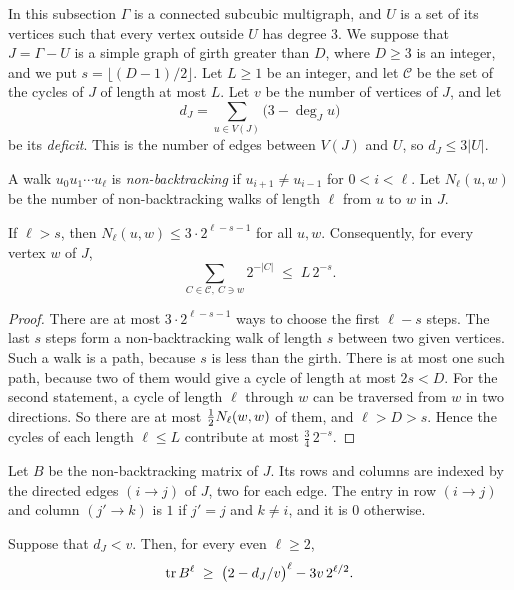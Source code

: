 In this subsection $\Gamma$ is a connected subcubic multigraph, and $U$ is a set of its vertices
such that every vertex outside $U$ has degree $3$. We suppose that
$J=\Gamma-U$ is a simple graph of girth greater than $D$, where $D\ge3$ is an integer, and we put
$s=\lfloor(D-1)/2\rfloor$. Let $L\ge1$ be an integer, and let $\mathcal{C}$ be the set of the
cycles of $J$ of length at most $L$. Let $v$ be the number of vertices of $J$, and let
\[
  d_J=\sum_{u\in V(J)}\bigl(3-\deg_Ju\bigr)
\]
be its \emph{deficit}. This is the number of edges between $V(J)$ and $U$, so $d_J\le3|U|$.

A walk $u_0u_1\cdots u_\ell$ is \emph{non-backtracking} if $u_{i+1}\ne u_{i-1}$ for $0<i<\ell$. Let
$N_\ell(u,w)$ be the number of non-backtracking walks of length $\ell$ from $u$ to $w$ in $J$.

\begin{lemma}\label{lem:walks}
If $\ell>s$, then $N_\ell(u,w)\le3\cdot2^{\ell-s-1}$ for all $u,w$. Consequently, for every vertex
$w$ of $J$,
\begin{equation}\label{eq:load}
  \sum_{C\in\mathcal{C},\ C\ni w}2^{-|C|}\;\le\;L\,2^{-s}.
\end{equation}
\end{lemma}

\begin{proof}
There are at most $3\cdot2^{\ell-s-1}$ ways to choose the first $\ell-s$ steps. The last $s$ steps
form a non-backtracking walk of length $s$ between two given vertices. Such a walk is a path,
because $s$ is less than the girth. There is at most one such path, because two of them would give
a cycle of length at most $2s<D$. For the second statement, a cycle of length $\ell$ through $w$
can be traversed from $w$ in two directions. So there are at most $\tfrac12 N_\ell(w,w)$ of them, and
$\ell>D>s$. Hence the cycles of each length $\ell\le L$ contribute at most $\frac34\,2^{-s}$.
\end{proof}

Let $B$ be the non-backtracking matrix of $J$. Its rows and columns are indexed by the directed
edges $(i\to j)$ of $J$, two for each edge. The entry in row $(i\to j)$ and column $(j'\to k)$ is
$1$ if $j'=j$ and $k\ne i$, and it is $0$ otherwise.

\begin{lemma}\label{lem:spectrum}
Suppose that $d_J<v$. Then, for every even $\ell\ge2$,
\[
  \operatorname{tr} B^{\ell}\;\ge\;\bigl(2-d_J/v\bigr)^{\ell}-3v\,2^{\ell/2}.
\]
\end{lemma}

